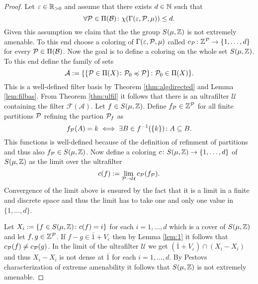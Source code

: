 \begin{proof}
  Let $\varepsilon \in \R_{>0}$ and assume that there exists $d \in \N$ such that
  \begin{equation*}
    \forall \P \in \Pi(\mathcal{B})\colon \chi(\Gamma(\varepsilon, {\P}, \mu)) \leq d. 
  \end{equation*}
  Given this assumption we claim that the the group $S(\mu, \Z)$ is not extremely amenable. To this end choose a coloring of $\Gamma(\varepsilon, \P, \mu)$ called $c_{\P}\colon \Z^{\P} \to \{1, \ldots, d\}$ for every $\P \in \Pi(\mathcal{B})$. Now the goal is to define a coloring on the whole set $S(\mu, \Z)$. To this end define the family of sets
  \begin{equation*}
    \mathcal{A} := \{\{ \P \in \Pi(X)\colon \P_0 \preccurlyeq \P\}\colon \P_0 \in \Pi(X)\}.
  \end{equation*}
  This is a well-defined filter basis by Theorem \ref{thm:algdirected} and Lemma \ref{lem:filbas}. From Theorem \ref{thm:ulfil} it follows that there is an ultrafilter $\mathcal{U}$ containing the filter $\mathcal{F}(\mathcal{A})$.
 Let $f \in S(\mu, \Z)$. Define $f_\P \in \Z^\P$ for all finite partitions $\P$ refining the partion $\P_f$ as
  \begin{equation*}
    f_\P(A) = k \iff \exists B \in f^{-1}(\{k\})\colon A \subseteq B. 
  \end{equation*}
  This functions is well-defined because of the definition of refinment of partitions and thus also $f_\P \in S(\mu, \Z)$.
  Now define a coloring $c\colon S(\mu, \Z) \to \{1, \ldots, d\}$ of $S(\mu, \Z)$ as the limit over the ultrafilter
  \begin{equation*}
    c(f) := \lim\limits_{\P \to \mathcal{U}} c_{\P}(f_\P).
  \end{equation*}
  Convergence of the limit above is ensured by the fact that it is a limit in a finite and discrete space and thus the limit has to take one and only one value in $\{1, \ldots, d\}$.
  
  Let $X_i := \{f \in S(\mu, \Z)\colon c(f) = i\}$ for each $i = 1, \ldots, d$ which is a cover of $S(\mu, \Z)$ and let $f, g \in \Z^\P$. If $f - g\in \bar{1} + V_\varepsilon$ then by Lemma \ref{lem:1} it follows that $c_\P(f) \neq c_\P(g)$.
  In the limit of the ultrafilter $\mathcal{U}$ we get $(\bar{1} + V_\varepsilon) \cap (X_i - X_i)$ and thus $X_i - X_i$ is not dense at $\bar{1}$ for each $i = 1, \ldots, d$. By Pestovs characterization \cite[Theorem 3.4.9]{PestovDyn} of extreme amenability it follows that $S(\mu, \Z)$ is not extremely amenable. 


\end{proof}
